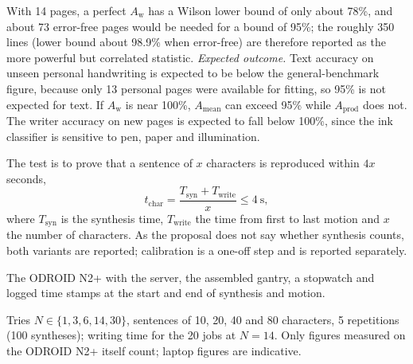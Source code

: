 
            With 14 pages, a perfect $A_{\mathrm{w}}$ has a Wilson lower bound of only about 78\%, and about 73 error-free pages would be needed for a bound of 95\%; the roughly 350 lines (lower bound about 98.9\% when error-free) are therefore reported as the more powerful but correlated statistic.
            \emph{Expected outcome.}
            Text accuracy on unseen personal handwriting is expected to be below the general-benchmark figure, because only 13 personal pages were available for fitting, so 95\% is not expected for text.
            If $A_{\mathrm{w}}$ is near 100\%, $A_{\mathrm{mean}}$ can exceed 95\% while $A_{\mathrm{prod}}$ does not.
            The writer accuracy on new pages is expected to fall below 100\%, since the ink classifier is sensitive to pen, paper and illumination.


\medskip
\label{sec:res-qtp3}


            The test is to prove that a sentence of $x$ characters is reproduced within $4x$ seconds,
            \begin{equation}
            \label{eq:res-r3}
            t_{\mathrm{char}}=\frac{T_{\mathrm{syn}}+T_{\mathrm{write}}}{x}\le 4\ \mathrm{s},
            \end{equation}
            where $T_{\mathrm{syn}}$ is the synthesis time, $T_{\mathrm{write}}$ the time from first to last motion and $x$ the number of characters.
            As the proposal does not say whether synthesis counts, both variants are reported; calibration is a one-off step and is reported separately.


            The ODROID N2+ with the server, the assembled gantry, a stopwatch and logged time stamps at the start and end of synthesis and motion.


            Tries $N\in\{1,3,6,14,30\}$, sentences of 10, 20, 40 and 80 characters, 5 repetitions (100 syntheses); writing time for the 20 jobs at $N=14$.
            Only figures measured on the ODROID N2+ itself count; laptop figures are indicative.

